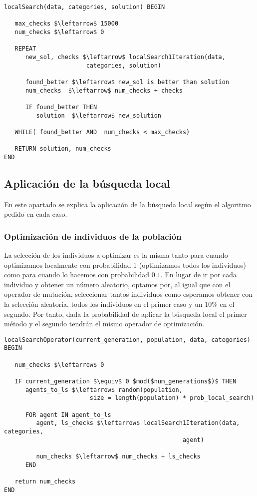 \documentclass[11pt,leqno]{article}
\begin{document}
	
\begin{lstlisting}[mathescape=true]
localSearch(data, categories, solution) BEGIN	

   max_checks $\leftarrow$ 15000
   num_checks $\leftarrow$ 0

   REPEAT
      new_sol, checks $\leftarrow$ localSearch1Iteration(data, 
                       categories, solution)
                       
      found_better $\leftarrow$ new_sol is better than solution
      num_checks  $\leftarrow$ num_checks + checks
      
      IF found_better THEN
         solution  $\leftarrow$ new_solution
		
   WHILE( found_better AND  num_checks < max_checks)
      
   RETURN solution, num_checks
END
\end{lstlisting}

\subsection{Aplicación de la búsqueda local}

En este apartado se explica la aplicación de la búsqueda local según el algoritmo pedido en cada caso. 

\subsubsection{Optimización de individuos de la población}

La selección de los individuos a optimizar es la misma tanto para cuando optimizamos localmente con probabilidad 1 (optimizamos todos los individuos) como para cuando lo hacemos con probabilidad $0.1$. En lugar de ir por cada individuo y obtener un número aleatorio, optamos por, al igual que con el operador de mutación, seleccionar tantos individuos como esperamos obtener con la selección aleatoria, todos los individuos en el primer caso y un $10\%$ en el segundo. Por tanto, dada la probabilidad de aplicar la búsqueda local el primer método y el segundo tendrán el mismo operador de optimización.

\begin{lstlisting}[mathescape=true] 
localSearchOperator(current_generation, population, data, categories) BEGIN
   
   num_checks $\leftarrow$ 0
   
   IF current_generation $\equiv$ 0 $mod($num_generations$)$ THEN
      agents_to_ls $\leftarrow$ random(population,
                        size = length(population) * prob_local_search)
                                       
      FOR agent IN agent_to_ls
         agent, ls_checks $\leftarrow$ localSearch1Iteration(data, categories,
                                                  agent)
         
         num_checks $\leftarrow$ num_checks + ls_checks
      END
   
   return num_checks
END
\end{lstlisting}
\end{document}
